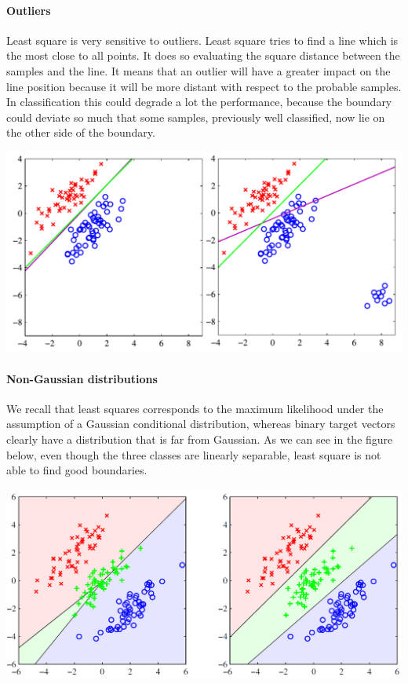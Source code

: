 \documentclass[../main.tex]{subfiles}
\begin{document}
\paragraph{Outliers} Least square is very sensitive to outliers. Least square tries to find a line which is the most close to all points. It does so evaluating the square distance between the samples and the line. It means that an outlier will have a greater impact on the line position because it will be more distant with respect to the probable samples. In classification this could degrade a lot the performance, because the boundary could deviate so much that some samples, previously well classified, now lie on the other side of the boundary.
\begin{center}
    \includegraphics[scale=0.50]{images/LS_Outliers.PNG}
\end{center}

\paragraph{Non-Gaussian distributions}
We recall that least squares corresponds to the maximum likelihood under the assumption of a Gaussian conditional distribution, whereas binary target vectors clearly have a distribution that is far from Gaussian. As we can see in the figure below, even though the three classes are linearly separable, least square is not able to find good boundaries.
\begin{center}
    \includegraphics[scale=0.40]{images/LS_nongaussian.PNG}
\end{center}
\end{document}
